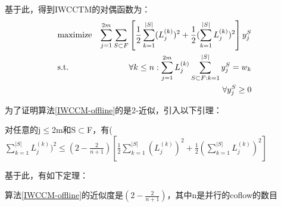 基于此，得到IWCCTM的对偶函数为：
 \begin{eqnarray}\label{IWCCTM4}
 & {\rm maximize} & \sum_{j=1}^{2m}\sum_{S\subset F}\left [\frac{1}{2}\sum_{k=1}^{|S|} (L_{j}^{(k)})^2+ \frac{1}{2}(\sum_{k=1}^{|S|} L_{j}^{(k)})^2 \right ] y_j^S\label{eq:WCCO-SC4} \\
& {\rm s.t.} & \forall k\leq n:\sum_{j=1}^{2m} L_{j}^{(k)} \sum_{S\subset F:k=1}^{|S|} y_j^S=w_k  \label{eq:IWCCM-SC5}\\
& & \forall  y_j^S\geq 0  \label{eq:IWCCM-SC6}
\end{eqnarray}

为了证明算法\ref{IWCCM-offline}的是2-近似，引入以下引理：
 \begin{lemma}\label{IWCCTM-proof3}
 对任意的j$\leq $2m和S$\subset$F，有($\sum_{k=1}^{|S|}L_{j}^{(k)})^2\leq (2-\frac{2}{n+1})\left [ \frac{1}{2}\sum_{k=1}^{|S|} (L_{j}^{(k)})^2+ \frac{1}{2}(\sum_{k=1}^{|S|} L_{j}^{(k)})^2 \right ]$
\end{lemma}

基于此，有如下定理：

 \begin{theorem}\label{IWCCTM5}
 算法\ref{IWCCM-offline}的近似度是$(2-\frac{2}{n+1})$，其中n是并行的coflow的数目
 \end{theorem}

